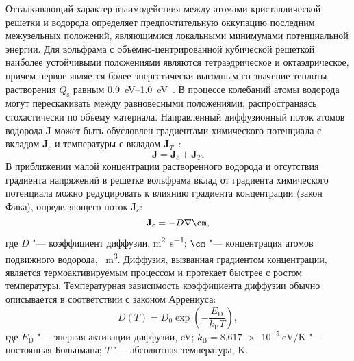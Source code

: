 Отталкивающий характер взаимодействия между атомами кристаллической решетки и водорода определяет предпочтительную оккупацию последним межузельных положений, являющимися локальными минимумами потенциальной энергии. Для вольфрама с объемно-центрированной кубической решеткой наиболее устойчивыми положениями являются тетраэдрическое и октаэдрическое, причем первое является более энергетически выгодным со значение теплоты растворения $Q_\mathrm{s}$ равным \SIrange{0.9}{1.0}{\electronvolt}~\cite{Heinola2010,Johnson2010,Fernandez2015,Zhou2024}. В процессе колебаний атомы водорода могут перескакивать между равновесными положениями, распространяясь стохастически по объему материала. Направленный диффузионный поток атомов водорода $\mathbf{J}$ может быть обусловлен градиентами химического потенциала с вкладом $\mathbf{J}_c$ и температуры с вкладом $\mathbf{J}_T$~\cite{Longhurst1985, Krom1999, Martinez2021}:
\begin{equation}
    \mathbf{J}=\mathbf{J}_c+\mathbf{J}_T.
\end{equation}
В приближении малой концентрации растворенного водорода и отсутствия градиента напряжений в решетке вольфрама вклад от градиента химического потенциала можно редуцировать к влиянию градиента концентрации (закон Фика), определяющего поток $\mathbf{J}_{c}$:
\begin{equation}
    \mathbf{J}_{c} = -D \nabla \cm,
\end{equation}
где $D$ "--- коэффициент диффузии, \si{\meter\squared\per\second}; $\cm$ "--- концентрация атомов подвижного водорода, \si{\per\meter\cubed}. Диффузия, вызванная градиентом концентрации, является термоактивируемым процессом и протекает быстрее с ростом температуры. Температурная зависимость коэффициента диффузии обычно описывается в соответствии с законом Аррениуса:
\begin{equation}
    D(T)=D_0 \exp\left( -\frac{E_\mathrm{D}}{k_\mathrm{B}T} \right),
\end{equation}
где $E_\mathrm{D}$ "--- энергия активации диффузии, \si{\electronvolt}; $k_\mathrm{B}=\SI{8.617e-5}{\electronvolt\per\kelvin}$ "--- постоянная Больцмана; $T$ "--- абсолютная температура, \si{\kelvin}.

